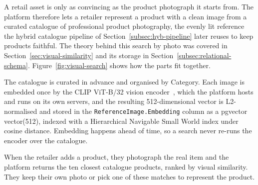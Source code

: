 A retail asset is only as convincing as the product photograph it starts from. The platform therefore lets a retailer represent a product with a clean image from a curated catalogue of professional product photography, the evenly lit reference the hybrid catalogue pipeline of Section~\ref{subsec:hyb-pipeline} later reuses to keep products faithful. The theory behind this search by photo was covered in Section~\ref{sec:visual-similarity} and its storage in Section~\ref{subsec:relational-schema}. Figure~\ref{fig:visual-search} shows how the parts fit together.

The catalogue is curated in advance and organised by Category. Each image is embedded once by the CLIP ViT-B/32 vision encoder~\cite{radford2021clip}, which the platform hosts and runs on its own servers, and the resulting 512-dimensional vector is L2-normalised and stored in the \texttt{ReferenceImage.Embedding} column as a pgvector vector(512), indexed with a Hierarchical Navigable Small World index under cosine distance. Embedding happens ahead of time, so a search never re-runs the encoder over the catalogue.

When the retailer adds a product, they photograph the real item and the platform returns the ten closest catalogue products, ranked by visual similarity. They keep their own photo or pick one of these matches to represent the product.

